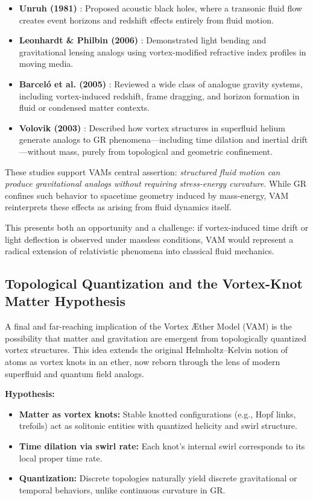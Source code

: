 \begin{itemize}
    \item \textbf{Unruh (1981)} \cite{unruh1981}: Proposed acoustic black holes, where a transonic fluid flow creates event horizons and redshift effects entirely from fluid motion.

    \item \textbf{Leonhardt \& Philbin (2006)} \cite{leonhardt2006}: Demonstrated light bending and gravitational lensing analogs using vortex-modified refractive index profiles in moving media.

    \item \textbf{Barceló et al. (2005)} \cite{barcelo2005}: Reviewed a wide class of analogue gravity systems, including vortex-induced redshift, frame dragging, and horizon formation in fluid or condensed matter contexts.

    \item \textbf{Volovik (2003)} \cite{volovik2003}: Described how vortex structures in superfluid helium generate analogs to GR phenomena---including time dilation and inertial drift---without mass, purely from topological and geometric confinement.
\end{itemize}

These studies support VAM\rqs s central assertion: \emph{structured fluid motion can produce gravitational analogs without requiring stress-energy curvature}. While GR confines such behavior to spacetime geometry induced by mass-energy, VAM reinterprets these effects as arising from fluid dynamics itself.

This presents both an opportunity and a challenge: if vortex-induced time drift or light deflection is observed under massless conditions, VAM would represent a radical extension of relativistic phenomena into classical fluid mechanics.

\subsection{Topological Quantization and the Vortex-Knot Matter Hypothesis}

A final and far-reaching implication of the Vortex Æther Model (VAM) is the possibility that matter and gravitation are emergent from topologically quantized vortex structures. This idea extends the original Helmholtz–Kelvin notion of atoms as vortex knots in an ether, now reborn through the lens of modern superfluid and quantum field analogs.

\textbf{Hypothesis:}
\begin{itemize}
    \item \textbf{Matter as vortex knots:} Stable knotted configurations (e.g., Hopf links, trefoils) act as solitonic entities with quantized helicity and swirl structure.
    \item \textbf{Time dilation via swirl rate:} Each knot's internal swirl corresponds to its local proper time rate.
    \item \textbf{Quantization:} Discrete topologies naturally yield discrete gravitational or temporal behaviors, unlike continuous curvature in GR.
\end{itemize}

